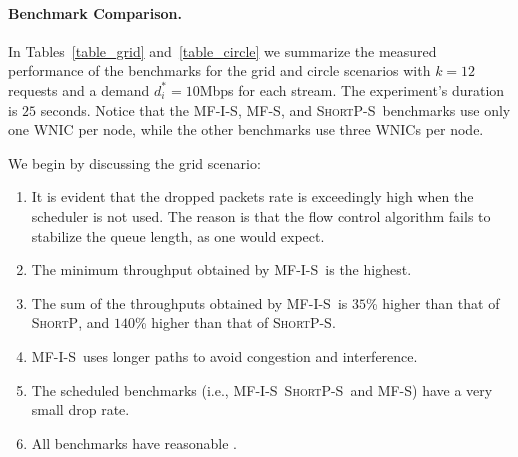 \documentclass[12pt]{article}
\newenvironment{proof sketch}[1]{\noindent {\emph{Proof sketch of #1:}}}{\hfill \qed}
\newcommand{\PER}{\text{\sc{per}}}
\newcommand{\algA}{\textsc{MF-I-S}}
\newcommand{\algB}{\textsc{ShortP}}
\newcommand{\algBS}{\textsc{ShortP-S}}
\newcommand{\algE}{\textsc{MF-S}}
\newcommand{\algS}{\algB}
\begin{document}

\paragraph{Benchmark Comparison.}
In Tables~\ref{table_grid} and~\ref{table_circle} we summarize the
measured performance of the benchmarks for the grid and circle
scenarios with $k=12$ requests and a demand $d^*_i=10$Mbps for each
stream. The experiment's duration is $25$ seconds.
Notice that the \algA , \algE , and \algBS\ benchmarks use only one WNIC
per node, while the other benchmarks use three WNICs per node.

We begin by discussing the grid scenario:
\begin{enumerate}[(1)]
\item It is evident that the dropped packets
    rate is exceedingly high when the scheduler is not used. The reason is
    that the flow control algorithm fails to stabilize the queue length, as
    one would expect.
\item The minimum throughput obtained by \algA\ is the highest.
\item The sum of the throughputs obtained by \algA\ is $35$\% higher
  than that of \algS, and $140$\% higher
  than that of \algBS.
\item \algA\ uses longer paths to avoid congestion and interference.
\item The scheduled benchmarks (i.e., \algA\, \algBS\ and \algE ) have a very small drop rate.
\item  All benchmarks have reasonable \PER.
\end{enumerate}
\end{document}
